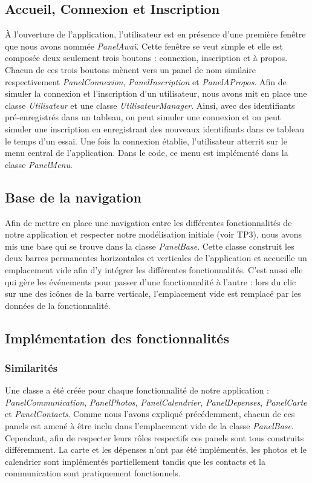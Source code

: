 \documentclass[11pt]{article}
\begin{document}
\subsection{Accueil, Connexion et Inscription}
À l'ouverture de l'application, l'utilisateur est en présence d'une première fenêtre que nous avons nommée \textit{PanelAwaï}. Cette fenêtre se veut simple et elle est composée deux seulement trois boutons : connexion, inscription et à propos. Chacun de ces trois boutons mènent vers un panel de nom similaire respectivement \textit{PanelConnexion}, \textit{PanelInscription} et \textit{PanelAPropos}. Afin de simuler la connexion et l'inscription d'un utilisateur, nous avons mit en place une classe \textit{Utilisateur} et une classe \textit{UtilisateurManager}. Ainsi, avec des identifiants pré-enregistrés dans un tableau, on peut simuler une connexion et on peut simuler une inscription en enregistrant des nouveaux identifiants dans ce tableau le temps d'un essai. Une fois la connexion établie, l'utilisateur atterrit sur le menu central de l'application. Dans le code, ce menu est implémenté dans la classe \textit{PanelMenu}.

\subsection{Base de la navigation}
Afin de mettre en place une navigation entre les différentes fonctionnalités de notre application et respecter notre modélisation initiale (voir TP3), nous avons mis une base qui se trouve dans la classe \textit{PanelBase}. Cette classe construit les deux barres permanentes horizontales et verticales de l'application et accueille un emplacement vide afin d'y intégrer les différentes fonctionnalités. C'est aussi elle qui gère les événements pour passer d'une fonctionnalité à l'autre : lors du clic sur une des icônes de la barre verticale, l'emplacement vide est remplacé par les données de la fonctionnalité.

\subsection{Implémentation des fonctionnalités}
\subsubsection{Similarités}
Une classe a été créée pour chaque fonctionnalité de notre application : \textit{PanelCommunication}, \textit{PanelPhotos}, \textit{PanelCalendrier}, \textit{PanelDepenses}, \textit{PanelCarte} et \textit{PanelContacts}. Comme nous l'avons expliqué précédemment, chacun de ces panels est amené à être inclu dans l'emplacement vide de la classe \textit{PanelBase}. Cependant, afin de respecter leurs rôles respectifs ces panels sont tous construits différemment. La carte et les dépenses n'ont pas été implémentés, les photos et le calendrier sont implémentés partiellement tandis que les contacts et la communication sont pratiquement fonctionnels.
\end{document}
